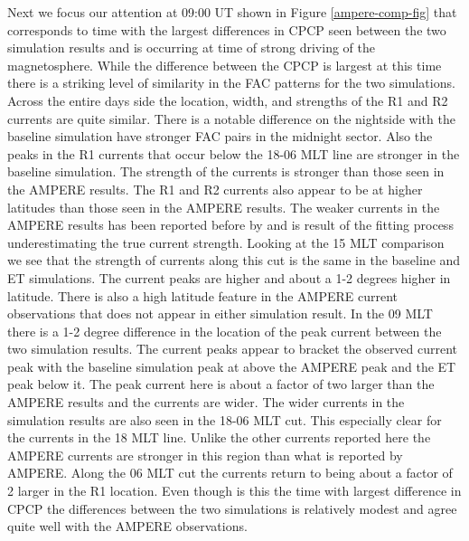 \documentclass[draft,jgrga]{agutex}
\begin{document}
\begin{article}
Next we focus our attention at 09:00 UT shown in Figure \ref{ampere-comp-fig} that corresponds to time with the largest differences in CPCP seen between the two simulation results and is occurring at time of strong driving of the magnetosphere.  While the difference between the CPCP is largest at this time there is a striking level of similarity in the FAC patterns for the two simulations.  Across the entire days side the location, width, and strengths of the R1 and R2 currents are quite similar.  There is a notable difference on the nightside with the baseline simulation have stronger FAC pairs in the midnight sector.  Also the peaks in the R1 currents that occur below the 18-06 MLT line are stronger in the baseline simulation.  The strength of the currents is stronger than those seen in the AMPERE results.  The R1 and R2 currents also appear to be at higher latitudes than those seen in the AMPERE results.  The weaker currents in the AMPERE results has been reported before by \cite{2013JGRA..118.4977M} and is result of the fitting process underestimating the true current strength.  Looking at the 15 MLT comparison we see that the strength of currents along this cut is the same in the baseline and ET simulations.  The current peaks are higher and about a 1-2 degrees higher in latitude.  There is also a high latitude feature in the AMPERE current observations that does not appear in either simulation result.  In the 09 MLT there is a 1-2 degree difference in the location of the peak current between the two simulation results.  The current peaks appear to bracket the observed current peak with the baseline simulation peak at above the AMPERE peak and the ET peak below it.   The peak current here is about a factor of two larger than the AMPERE results and the currents are wider.  The wider currents in the simulation results are also seen in the 18-06 MLT cut.  This especially clear for the currents in the 18 MLT line.  Unlike the other currents reported here the AMPERE currents are stronger in this region than what is reported by AMPERE.  Along the 06 MLT cut the currents return to being about a factor of 2 larger in the R1 location.  Even though is this the time with largest difference in CPCP the differences between the two simulations is relatively modest and agree quite well with the AMPERE observations.


\end{article}
\end{document}
